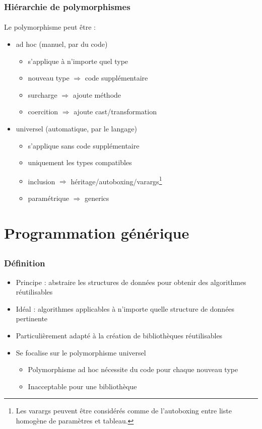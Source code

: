 \documentclass[draft]{beamer}
\begin{document}
\begin{frame}
\frametitle{Hiérarchie de polymorphismes}
\framesubtitle{\cite{cardelli_understanding_1985}}
Le polymorphisme peut être :
\begin{itemize}
 \item<1-> ad hoc (manuel, par du code)
 \begin{itemize}
  \item<2->[Avantage] s'applique à n'importe quel type
  \item<2->[Inconvénient] nouveau type $\Rightarrow$ code supplémentaire
  \item<2-> surcharge $\Rightarrow$ ajoute méthode
  \item<2-> coercition $\Rightarrow$ ajoute cast/transformation
 \end{itemize}
 \item<1-> universel (automatique, par le langage)
 \begin{itemize}
  \item<3->[Avantage] s'applique sans code supplémentaire
  \item<3->[Inconvénient] uniquement les types compatibles
  \item<3-> inclusion $\Rightarrow$ héritage/autoboxing/varargs\footnote<3->{Les varargs peuvent être considérés comme de l'autoboxing entre liste homogène de paramètres et tableau.}
  \item<3-> paramétrique $\Rightarrow$ generics
 \end{itemize}
\end{itemize}
\end{frame}

\section{Programmation générique}
\subsection{}

\begin{frame}
\frametitle{Définition}
\begin{itemize}
 \item Principe : abstraire les structures de données pour obtenir des algorithmes réutilisables
 \item Idéal : algorithmes applicables à n'importe quelle structure de données pertinente
 \item Particulièrement adapté à la création de bibliothèques réutilisables
 \item Se focalise sur le polymorphisme universel
 \begin{itemize}
  \item Polymorphisme ad hoc nécessite du code pour chaque nouveau type
  \item Inacceptable pour une bibliothèque
 \end{itemize}
\end{itemize}
\end{frame}
\end{document}
